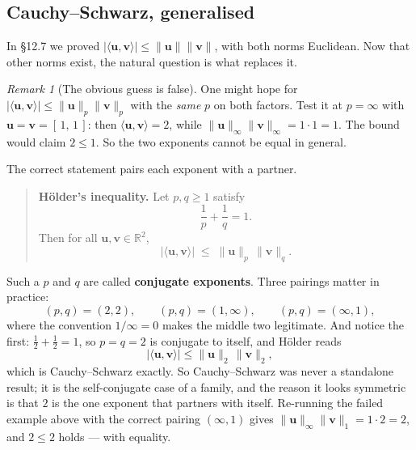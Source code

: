 \documentclass[11pt]{article}
\theoremstyle{definition}
\theoremstyle{remark}
\newtheorem*{rmk}{Remark}
\newcommand{\R}{\mathbb{R}}
\newcommand{\vc}[1]{\mathbf{#1}}
\newcommand{\norm}[1]{\lVert #1\rVert}
\begin{document}
\subsection{Cauchy--Schwarz, generalised}
In \S12.7 we proved
$\lvert\langle\vc{u},\vc{v}\rangle\rvert\le\norm{\vc{u}}\norm{\vc{v}}$, with both
norms Euclidean. Now that other norms exist, the natural question is what
replaces it.

\begin{rmk}[The obvious guess is false]
One might hope for
$\lvert\langle\vc{u},\vc{v}\rangle\rvert\le\norm{\vc{u}}_p\norm{\vc{v}}_p$ with
the \emph{same} $p$ on both factors. Test it at $p=\infty$ with
$\vc{u}=\vc{v}=[\,1,\,1\,]$: then $\langle\vc{u},\vc{v}\rangle=2$, while
$\norm{\vc{u}}_\infty\norm{\vc{v}}_\infty=1\cdot1=1$. The bound would claim
$2\le1$. So the two exponents cannot be equal in general.
\end{rmk}

\noindent The correct statement pairs each exponent with a partner.

\begin{quote}
\textbf{H\"older's inequality.} Let $p,q\ge1$ satisfy
\[
  \frac{1}{p}+\frac{1}{q} = 1 .
\]
Then for all $\vc{u},\vc{v}\in\R^{2}$,
\[
  \bigl\lvert\langle\vc{u},\vc{v}\rangle\bigr\rvert
  \;\le\; \norm{\vc{u}}_p\,\norm{\vc{v}}_q .
\]
\end{quote}

\noindent Such a $p$ and $q$ are called \textbf{conjugate exponents}. Three
pairings matter in practice:
\[
  (p,q)=(2,2), \qquad (p,q)=(1,\infty), \qquad (p,q)=(\infty,1),
\]
where the convention $1/\infty=0$ makes the middle two legitimate. And notice
the first: $\tfrac12+\tfrac12=1$, so $p=q=2$ is conjugate to itself, and
H\"older reads
\[
  \bigl\lvert\langle\vc{u},\vc{v}\rangle\bigr\rvert
  \le \norm{\vc{u}}_2\,\norm{\vc{v}}_2 ,
\]
which is Cauchy--Schwarz exactly. So Cauchy--Schwarz was never a standalone
result; it is the self-conjugate case of a family, and the reason it looks
symmetric is that $2$ is the one exponent that partners with itself. Re-running
the failed example above with the correct pairing $(\infty,1)$ gives
$\norm{\vc{u}}_\infty\norm{\vc{v}}_1=1\cdot2=2$, and $2\le2$ holds --- with
equality.

\end{document}
